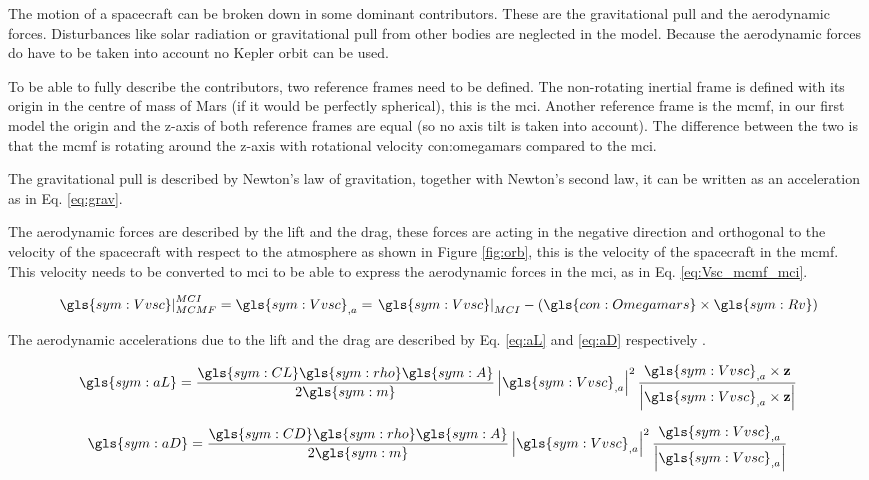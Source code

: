 The motion of a spacecraft can be broken down in some dominant contributors. These are the gravitational pull and the aerodynamic forces. Disturbances like solar radiation or gravitational pull from other bodies are neglected in the model. Because the aerodynamic forces do have to be taken into account no Kepler orbit can be used.

To be able to fully describe the contributors, two reference frames need to be defined. The non-rotating inertial frame is defined with its origin in the centre of mass of Mars (if it would be perfectly spherical), this is the \gls{mci}. 
Another reference frame is the \gls{mcmf}, in our first model the origin and the z-axis of both reference frames are equal (so no axis tilt is taken into account). The difference between the two is that the \gls{mcmf} is rotating around the z-axis with rotational velocity \gls{con:omegamars} compared to the \gls{mci}.

The gravitational pull is described by Newton's law of gravitation, together with Newton's second law, it can be written as an acceleration as in Eq. \ref{eq:grav}.

The aerodynamic forces are described by the lift and the drag, these forces are acting in the negative direction and orthogonal to the velocity of the spacecraft with respect to the atmosphere as shown in Figure \ref{fig:orb}, this is the velocity of the spacecraft in the \gls{mcmf}. This velocity needs to be converted to \gls{mci} to be able to express the aerodynamic forces in the \gls{mci}, as in Eq. \ref{eq:Vsc_mcmf_mci}.

\begin{equation} \label{eq:Vsc_mcmf_mci}
\left.\gls{sym:Vvsc}\right|_{MCMF}^{MCI} = \gls{sym:Vvsc}_{,a} = \left.\gls{sym:Vvsc}\right|_{MCI} - \left(\gls{con:Omegamars} \times \gls{sym:Rv} \right)
\end{equation}

The aerodynamic accelerations due to the lift and the drag are described by Eq. \ref{eq:aL} and \ref{eq:aD} respectively \cite{AndersonJr.2007}.

\begin{equation} \label{eq:aL}
\gls{sym:aL} = \frac{\gls{sym:CL}\gls{sym:rho}\gls{sym:A}}{2 \gls{sym:m}} 
				\left|\gls{sym:Vvsc}_{,a}\right|^2
				\frac{\gls{sym:Vvsc}_{,a} \times \mathbf{z}}
				{\left| \gls{sym:Vvsc}_{,a} \times \mathbf{z}\right|}
\end{equation}

\begin{equation} \label{eq:aD}
\gls{sym:aD} = \frac{\gls{sym:CD}\gls{sym:rho}\gls{sym:A}}{2 \gls{sym:m}}
				\left|\gls{sym:Vvsc}_{,a}\right|^2 \frac{\gls{sym:Vvsc}_{,a}}{\left|\gls{sym:Vvsc}_{,a}\right|}
\end{equation}

